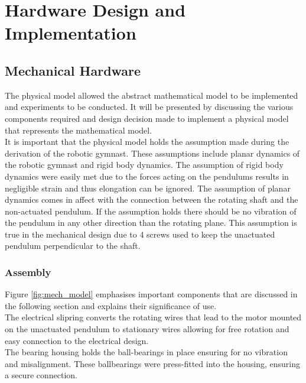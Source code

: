\chapter{Hardware Design and Implementation}


\section{Mechanical Hardware}
The physical model allowed the abstract mathematical model to be implemented and experiments to be conducted. It will be presented by discussing the various components required and design decision made to implement a physical model that represents the mathematical model.\\

It is important that the physical model holds the assumption made during the derivation of the robotic gymnast. These assumptions include planar dynamics of the robotic gymnast and rigid body dynamics. The assumption of rigid body dynamics were easily met due to the forces acting on the pendulums results in negligible strain and thus elongation can be ignored. The assumption of planar dynamics comes in affect with the connection between the rotating shaft and the non-actuated pendulum. If the assumption holds there should be no vibration of the pendulum in any other direction than the rotating plane. This assumption is true in the mechanical design due to 4 screws used to keep the unactuated pendulum perpendicular to the shaft. \\

\subsection{Assembly}
Figure \ref{fig:mech_model} emphasises important components that are discussed in the following section and explains their significance of use.\\

The electrical slipring converts the rotating wires that lead to the motor mounted on the unactuated pendulum to stationary wires allowing for free rotation and easy connection to the electrical design.\\

The bearing housing holds the ball-bearings in place ensuring for no vibration and misalignment. These ballbearings were press-fitted into the housing, ensuring a secure connection.\\

